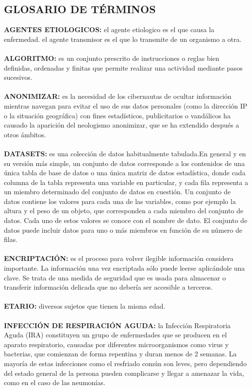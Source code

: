 \documentclass[a4paper,openright,12pt]{book}
\theoremstyle{definition}
\theoremstyle{remark}
\begin{document}
\begin{center}
 \chapter{GLOSARIO DE TÉRMINOS}\label{cap.glosario}
\end{center}
\textbf{AGENTES ETIOLOGICOS:} el agente etiologico es el que causa la enfermedad. el agente transmisor es el que lo transmite de un organismo a otra.\\\\
\textbf{ALGORITMO:} es un conjunto prescrito de instrucciones o reglas bien definidas, ordenadas y finitas que permite realizar una actividad mediante pasos sucesivos. \\\\
\textbf{ANONIMIZAR:} es la necesidad de los cibernautas de ocultar información mientras navegan para evitar el uso de sus datos personales (como la dirección IP o la situación geográfica) con fines estadísticos, publicitarios o vandálicos ha causado la aparición del neologismo anonimizar, que se ha extendido después a otros ámbitos.  \\\\
\textbf{DATASETS:} es una colección de datos habitualmente tabulada.En general y en su versión más simple, un conjunto de datos corresponde a los contenidos de una única tabla de base de datos o una única matriz de datos estadística, donde cada columna de la tabla representa una variable en particular, y cada fila representa a un miembro determinado del conjunto de datos en cuestión. Un conjunto de datos contiene los valores para cada una de las variables, como por ejemplo la altura y el peso de un objeto, que corresponden a cada miembro del conjunto de datos. Cada uno de estos valores se conoce con el nombre de dato. El conjunto de datos puede incluir datos para uno o más miembros en función de su número de filas.\\\\
\textbf{ENCRIPTACIÓN:} es el proceso para volver ilegible información considera importante. La información una vez encriptada sólo puede leerse aplicándole una clave. Se trata de una medida de seguridad que es usada para almacenar o transferir información delicada que no debería ser accesible a terceros.\\\\
\textbf{ETARIO:}  diversos sujetos que tienen la misma edad.\\\\
\textbf{INFECCIÓN DE RESPIRACIÓN AGUDA:} la Infección Respiratoria Aguda (IRA) constituyen un grupo de enfermedades que se producen en el aparato respiratorio, causadas por diferentes microorganismos como virus y bacterias, que comienzan de forma repentina y duran menos de 2 semanas. La mayoría de estas infecciones como el resfriado común son leves, pero dependiendo del estado general de la persona pueden complicarse y llegar a amenazar la vida, como en el caso de las neumonías. \\\\
\end{document}
